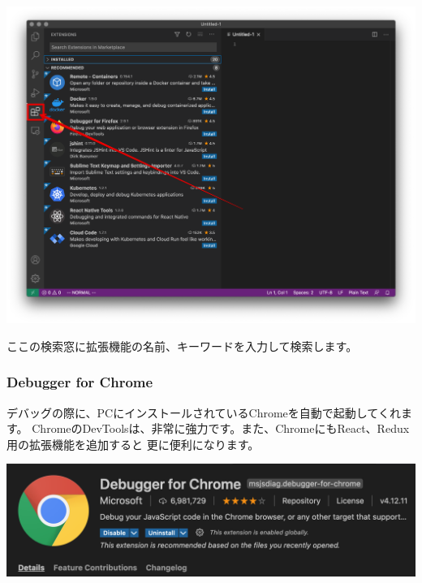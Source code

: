 \begin{reviewimage}[H]%
\includegraphics[width=0.9\maxwidth]{./images/01-createDevEnv/01_03vscodeExtension.png}%
\label{image:01-createDevEnv:01_03vscodeExtension}
\end{reviewimage}

ここの検索窓に拡張機能の名前、キーワードを入力して検索します。

\subsubsection*{Debugger for Chrome}
\keeplastskip{
  \label{sec:1-2-2-1}
  \par\nobreak
}

デバッグの際に、PCにインストールされているChromeを自動で起動してくれます。
ChromeのDevToolsは、非常に強力です。また、ChromeにもReact、Redux用の拡張機能を追加すると
更に便利になります。

\begin{reviewimage}[H]%
\includegraphics[width=1.0\maxwidth]{./images/01-createDevEnv/01_06vscodeExtension_debuggerForChrome.png}%
\label{image:01-createDevEnv:01_06vscodeExtension_debuggerForChrome}
\end{reviewimage}

